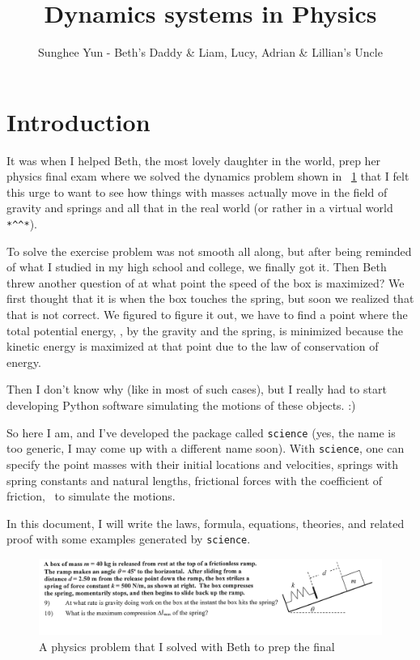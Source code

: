 \documentclass{article}
\title{Dynamics systems in Physics}
\author{Sunghee Yun - Beth's Daddy \& Liam, Lucy, Adrian \& Lillian's Uncle}
\begin{document}
\maketitle
\tableofcontents

\newpage

\section{Introduction}

It was when I helped Beth, the most lovely daughter in the world, prep her physics final exam
where we solved the dynamics problem shown in \figurename~\ref{fig:high-school-physics-problem}
that I felt this urge to want to see how things with masses actually move in the field of gravity and springs and all that in the real world
(or rather in a virtual world \verb+*^^*+).

To solve the exercise problem was not smooth all along, but after being reminded of what I studied in my high school and college,
we finally got it. Then Beth threw another question of at what point the speed of the box is maximized?
We first thought that it is when the box touches the spring, but soon we realized that that is not correct.
We figured to figure it out, we have to find a point where the total potential energy,
\ie, by the gravity and the spring, is minimized
because the kinetic energy is maximized at that point
due to the law of conservation of energy.

Then I don't know why (like in most of such cases),
but I really had to start developing Python software
simulating the motions of these objects. :)

So here I am, and I've developed the package called {\tt science}
(yes, the name is too generic, I may come up with a different name soon).
With {\tt science},
one can specify the point masses with their initial locations and velocities,
springs with spring constants and natural lengths,
frictional forces with the coefficient of friction,
\etc\
to simulate the motions.

In this document,
I will write the laws, formula, equations, theories, and related proof
with some examples generated by {\tt science}.

\begin{figure}
\begin{center}
\includegraphics[trim = 10 40 20 05, clip, width=.9\textwidth]{figures/physics-problem}
\end{center}
\caption{A physics problem that I solved with Beth to prep the final}
\label{fig:high-school-physics-problem}
\end{figure}
\end{document}
